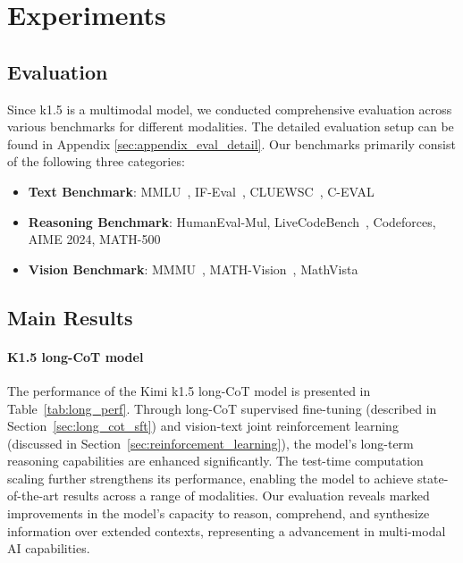 \documentclass{article}
\newcommand{\citep}[1]{\parencite{#1}}
\begin{document}
\section{Experiments}

\subsection{Evaluation}

Since k1.5 is a multimodal model, we conducted comprehensive evaluation across various benchmarks for different modalities. The detailed evaluation setup can be found in Appendix \ref{sec:appendix_eval_detail}. Our benchmarks primarily consist of the following three categories:

\begin{itemize}
    \item \textbf{Text Benchmark}: MMLU~\citep{Hendrycks2020MeasuringMM}, IF-Eval~\citep{Zhou2023InstructionFollowingEF}, CLUEWSC~\citep{Xu2020CLUEAC}, C-EVAL~\citep{Huang2023CEvalAM} 
    \item \textbf{Reasoning Benchmark}:
    HumanEval-Mul, LiveCodeBench~\citep{Jain2024LiveCodeBenchHA}, Codeforces, AIME 2024, MATH-500~\citep{lightman2023lets}
    \item \textbf{Vision Benchmark}:
    MMMU~\citep{yue2024mmmu}, MATH-Vision~\citep{wang2024measuring}, MathVista~\citep{lu2023mathvista}
\end{itemize}

\subsection{Main Results}

\paragraph{K1.5 long-CoT model}

The performance of the Kimi k1.5 long-CoT model is presented in Table~\ref{tab:long_perf}. Through long-CoT supervised fine-tuning (described in Section~\ref{sec:long_cot_sft}) and vision-text joint reinforcement learning (discussed in Section~\ref{sec:reinforcement_learning}), the model's long-term reasoning capabilities are enhanced significantly. The test-time computation scaling further strengthens its performance, enabling the model to achieve state-of-the-art results across a range of modalities. Our evaluation reveals marked improvements in the model's capacity to reason, comprehend, and synthesize information over extended contexts, representing a advancement in multi-modal AI capabilities.
\end{document}
